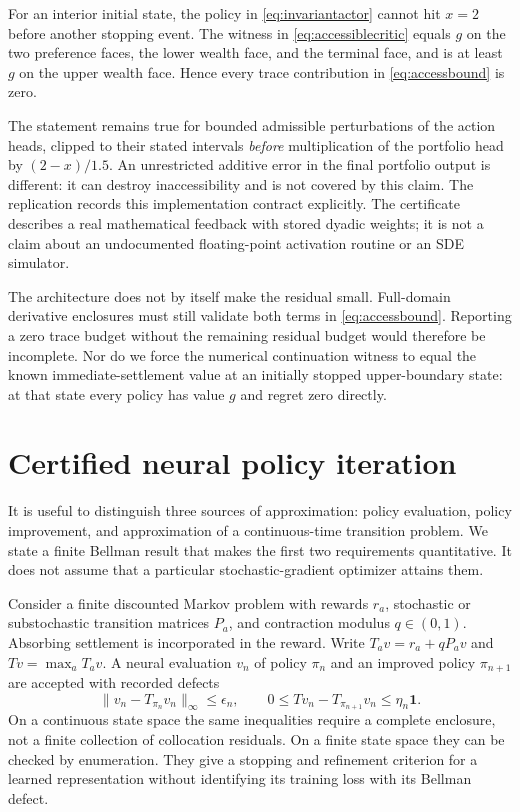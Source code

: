 \begin{proposition}\label{prop:architecture}
For an interior initial state, the policy in \eqref{eq:invariantactor} cannot hit $x=2$ before another stopping event. The witness in \eqref{eq:accessiblecritic} equals $g$ on the two preference faces, the lower wealth face, and the terminal face, and is at least $g$ on the upper wealth face. Hence every trace contribution in \eqref{eq:accessbound} is zero.
\end{proposition}
The statement remains true for bounded admissible perturbations of the action heads, clipped to their stated intervals \emph{before} multiplication of the portfolio head by $(2-x)/1.5$. An unrestricted additive error in the final portfolio output is different: it can destroy inaccessibility and is not covered by this claim. The replication records this implementation contract explicitly. The certificate describes a real mathematical feedback with stored dyadic weights; it is not a claim about an undocumented floating-point activation routine or an SDE simulator.

The architecture does not by itself make the residual small. Full-domain derivative enclosures must still validate both terms in \eqref{eq:accessbound}. Reporting a zero trace budget without the remaining residual budget would therefore be incomplete. Nor do we force the numerical continuation witness to equal the known immediate-settlement value at an initially stopped upper-boundary state: at that state every policy has value $g$ and regret zero directly.

\section{Certified neural policy iteration}\label{sec:certifiediteration}
It is useful to distinguish three sources of approximation: policy evaluation, policy improvement, and approximation of a continuous-time transition problem. We state a finite Bellman result that makes the first two requirements quantitative. It does not assume that a particular stochastic-gradient optimizer attains them.

Consider a finite discounted Markov problem with rewards $r_a$, stochastic or substochastic transition matrices $P_a$, and contraction modulus $q\in(0,1)$. Absorbing settlement is incorporated in the reward. Write $T_a v=r_a+qP_av$ and $Tv=\max_a T_av$. A neural evaluation $v_n$ of policy $\pi_n$ and an improved policy $\pi_{n+1}$ are accepted with recorded defects
\begin{equation}
 \|v_n-T_{\pi_n}v_n\|_\infty\leq\epsilon_n,
 \qquad 0\leq Tv_n-T_{\pi_{n+1}}v_n\leq\eta_n\mathbf1.
 \label{eq:policydefects}
\end{equation}
On a continuous state space the same inequalities require a complete enclosure, not a finite collection of collocation residuals. On a finite state space they can be checked by enumeration. They give a stopping and refinement criterion for a learned representation without identifying its training loss with its Bellman defect.

